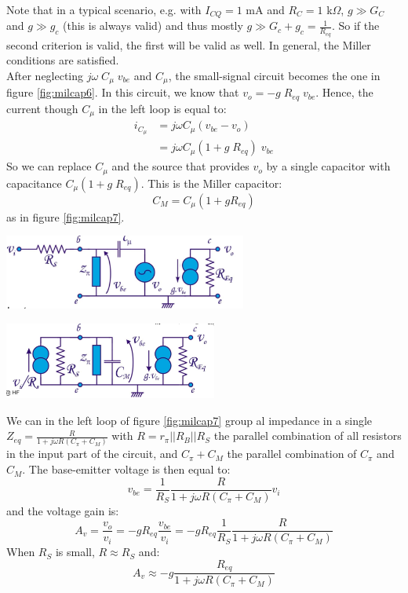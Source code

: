 Note that in a typical scenario, e.g. with $I_{CQ} = 1$ mA and $R_C = 1$ k$\Omega$, $g \gg G_C$ and $g \gg g_c$ (this is always valid) and thus mostly $g \gg G_c + g_c = \frac{1}{R_{eq}}$. So if the second criterion is valid, the first will be valid as well. In general, the Miller conditions are satisfied.\\
After neglecting $j \omega \; C_\mu  \;  v_{be}$ and $C_\mu$, the small-signal circuit becomes the one in figure \ref{fig:milcap6}. In this circuit, we know that $v_o = -g \; R_{eq} \; v_{be}$. Hence, the current though $C_\mu$ in the left loop is equal to:
\begin{align*}
	i_{C_\mu} &= j \omega C_\mu (v_{be} - v_o) \\
			  &= j \omega C_\mu (1 + g \; R_{eq}) \; v_{be}
\end{align*}
So we can replace $C_\mu$ and the source that provides $v_o$ by a single capacitor with capacitance $C_\mu (1 + g \; R_{eq})$. This is the Miller capacitor:
\begin{equation}
	C_M = C_\mu (1 + g  R_{eq})
	\label{eq:miller_cap}
\end{equation} 
as in figure \ref{fig:milcap7}. 

\begin{minipage}{.5\textwidth}
	\centering
	\includegraphics[width=8cm]{figures/ch03/milcap6.jpg}
	\label{fig:milcap6}
\end{minipage}%
\begin{minipage}{.5\textwidth}
	\centering
	\includegraphics[width=7cm]{figures/ch03/milcap7.jpg}
	\label{fig:milcap7}
\end{minipage}
We can in the left loop of figure \ref{fig:milcap7} group al impedance in a single $Z_{eq} = \frac{R}{1 + j \omega R(C_\pi + C_M)}$ with $R = r_\pi || R_B || R_S$ the parallel combination of all resistors in the input part of the circuit, and $C_\pi + C_M$ the parallel combination of $C_\pi$ and $C_M$. The base-emitter voltage is then equal to:
$$
v_{be} = \frac{1}{R_S} \frac{R}{1 + j \omega R(C_\pi + C_M)} v_i
$$
and the voltage gain is:
$$
A_v = \frac{v_o}{v_i} = - g R_{eq} \frac{v_{be}}{v_i} = - g R_{eq} \frac{1}{R_S} \frac{R}{1 + j \omega R(C_\pi + C_M)}
$$
When $R_S$ is small, $R \approx R_S$ and:
\begin{equation}
	A_v \approx - g  \frac{R_{eq}}{1 + j \omega R(C_\pi + C_M)}
	\label{eq:miller_gain}
\end{equation}


